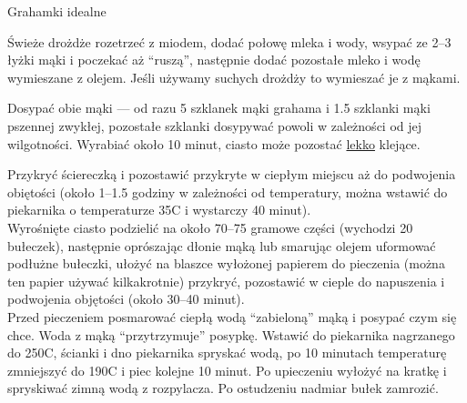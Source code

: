 \documentclass[a4paper,12pt]{article}
\begin{document}
\begin{recipe}{Grahamki idealne}{}{}


Świeże drożdże rozetrzeć z miodem, dodać połowę mleka i wody, wsypać ze 2--3 łyżki mąki i poczekać aż ``ruszą'',
następnie dodać pozostałe mleko i wodę wymieszane z olejem. Jeśli używamy suchych drożdży to  wymieszać je z mąkami.

Dosypać obie mąki --- od razu 5 szklanek mąki grahama i 1.5 szklanki mąki pszennej zwykłej, pozostałe  szklanki dosypywać powoli w zależności od jej wilgotności. Wyrabiać około 10 minut, ciasto
może pozostać \underline{lekko} klejące.

\freeform{}%
Przykryć ściereczką i pozostawić przykryte w ciepłym miejscu aż do podwojenia obiętości (około 1--1.5 godziny w zależności od temperatury, można wstawić do piekarnika o temperaturze 35\0C i
wystarczy 40 minut).\\

Wyrośnięte ciasto podzielić na około 70--75 gramowe części (wychodzi 20 bułeczek), następnie oprószając dłonie mąką lub smarując olejem uformować podłużne bułeczki, ułożyć na
blaszce wyłożonej papierem do pieczenia (można ten papier używać kilkakrotnie) przykryć, pozostawić w cieple do napuszenia i podwojenia objętości (około 30--40 minut).\\

Przed pieczeniem posmarować ciepłą wodą ``zabieloną'' mąką i posypać czym się chce. Woda z mąką ``przytrzymuje'' posypkę. Wstawić do piekarnika nagrzanego do 250\0C, ścianki i dno piekarnika spryskać wodą, po 10 minutach
temperaturę zmniejszyć do 190\0C i piec kolejne 10 minut. Po upieczeniu wyłożyć na kratkę i spryskiwać zimną wodą z rozpylacza. Po ostudzeniu nadmiar bułek zamrozić.

\end{recipe}
\end{document}

